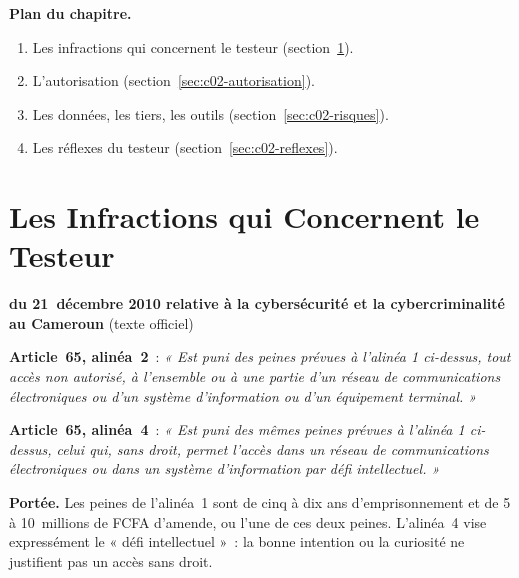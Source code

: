 \medskip
\textbf{Plan du chapitre.}
\begin{enumerate}
    \item Les infractions qui concernent le testeur (section~\ref{sec:c02-infractions}).
    \item L'autorisation (section~\ref{sec:c02-autorisation}).
    \item Les données, les tiers, les outils (section~\ref{sec:c02-risques}).
    \item Les réflexes du testeur (section~\ref{sec:c02-reflexes}).
\end{enumerate}

\separateur

\section{Les Infractions qui Concernent le Testeur}
\label{sec:c02-infractions}

\begin{boxjuris}
\textbf{ du 21~décembre 2010 relative à la
cybersécurité et la cybercriminalité au Cameroun} (texte officiel)

\medskip
\textbf{Article~65, alinéa~2}~: \textit{« Est puni des peines prévues à
l'alinéa 1 ci-dessus, tout accès non autorisé, à l'ensemble ou à une partie
d'un réseau de communications électroniques ou d'un système d'information
ou d'un équipement terminal. »}

\medskip
\textbf{Article~65, alinéa~4}~: \textit{« Est puni des mêmes peines prévues
à l'alinéa 1 ci-dessus, celui qui, sans droit, permet l'accès dans un réseau
de communications électroniques ou dans un système d'information par défi
intellectuel. »}

\medskip
\textbf{Portée.} Les peines de l'alinéa~1 sont de cinq à dix ans
d'emprisonnement et de 5 à 10~millions de FCFA d'amende, ou l'une de ces
deux peines. L'alinéa~4 vise expressément le « défi intellectuel »~: la
bonne intention ou la curiosité ne justifient pas un accès sans droit.
\end{boxjuris}

